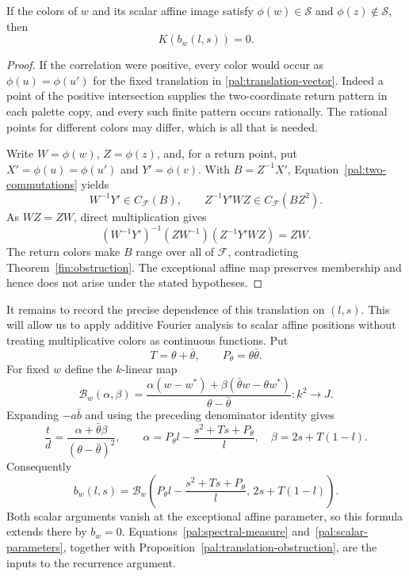 \begin{proposition}\label{pal:translation-obstruction}
If the colors of $w$ and its scalar affine image satisfy
$\phi(w)\in\mathcal S$ and $\phi(z)\notin\mathcal S$, then
\[
 K(b_w(l,s))=0.
\]
\end{proposition}

\begin{proof}
If the correlation were positive, every color would occur as
$\phi(u)=\phi(u')$ for the fixed translation in
\eqref{pal:translation-vector}.  Indeed a point of the positive
intersection supplies the two-coordinate return pattern in each
palette copy, and every such finite pattern occurs rationally.
The rational points for different colors may differ, which is all
that is needed.

Write $W=\phi(w)$, $Z=\phi(z)$, and, for a return point, put
$X'=\phi(u)=\phi(u')$ and $Y'=\phi(v)$.  With $B=Z^{-1}X'$,
Equation~\eqref{pal:two-commutations} yields
\[
 W^{-1}Y'\in C_{\mathcal F}(B),\qquad
 Z^{-1}Y'WZ\in C_{\mathcal F}(BZ^2).
\]
As $WZ=ZW$, direct multiplication gives
\[
 (W^{-1}Y')^{-1}(ZW^{-1})(Z^{-1}Y'WZ)=ZW.
\]
The return colors make $B$ range over all of $\mathcal F$, contradicting
Theorem~\ref{fin:obstruction}.  The exceptional affine map preserves
membership and hence does not arise under the stated hypotheses.
\end{proof}

It remains to record the precise dependence of this translation on
$(l,s)$.  This will allow us to apply additive Fourier analysis to
scalar affine positions without treating multiplicative colors as
continuous functions.  Put
\[
 T=\theta+\bar\theta,\qquad P_\theta=\theta\bar\theta.
\]
For fixed $w$ define the $k$-linear map
\[
 \mathcal B_w(\alpha,\beta)=
 \frac{\alpha(w-w^*)+\beta(\bar\theta w-\theta w^*)}
      {\theta-\bar\theta}:k^2\longrightarrow J.
\]
Expanding $-a\bar b$ and using the preceding denominator identity gives
\[
 \frac{t}{d}=
 \frac{\alpha+\bar\theta\beta}{(\theta-\bar\theta)^2},\qquad
 \alpha=P_\theta l-\frac{s^2+Ts+P_\theta}{l},\quad
 \beta=2s+T(1-l).
\]
Consequently
\begin{equation}\label{pal:scalar-parameters}
 b_w(l,s)=\mathcal B_w\left(
 P_\theta l-\frac{s^2+Ts+P_\theta}{l},\,2s+T(1-l)\right).
\end{equation}
Both scalar arguments vanish at the exceptional affine parameter, so
this formula extends there by $b_w=0$.  Equations~\eqref{pal:spectral-measure}
and~\eqref{pal:scalar-parameters}, together with
Proposition~\ref{pal:translation-obstruction}, are the inputs to the
recurrence argument.
